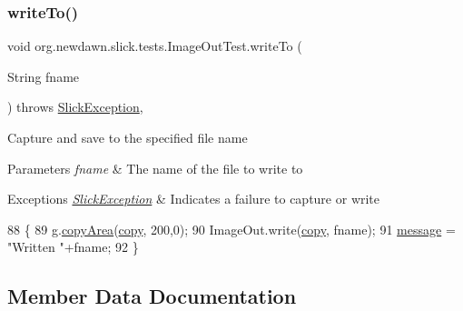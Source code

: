 \subsubsection{\texorpdfstring{write\+To()}{writeTo()}}
{\footnotesize\ttfamily void org.\+newdawn.\+slick.\+tests.\+Image\+Out\+Test.\+write\+To (\begin{DoxyParamCaption}\item[{String}]{fname }\end{DoxyParamCaption}) throws \mbox{\hyperlink{classorg_1_1newdawn_1_1slick_1_1_slick_exception}{Slick\+Exception}}\hspace{0.3cm}{\ttfamily [inline]}, {\ttfamily [private]}}

Capture and save to the specified file name


\begin{DoxyParams}{Parameters}
{\em fname} & The name of the file to write to \\
\hline
\end{DoxyParams}

\begin{DoxyExceptions}{Exceptions}
{\em \mbox{\hyperlink{classorg_1_1newdawn_1_1slick_1_1_slick_exception}{Slick\+Exception}}} & Indicates a failure to capture or write \\
\hline
\end{DoxyExceptions}

\begin{DoxyCode}
88                                                              \{
89         \mbox{\hyperlink{classorg_1_1newdawn_1_1slick_1_1tests_1_1_image_out_test_a0007b2187e2d4d26bdb2d90b39c62479}{g}}.\mbox{\hyperlink{classorg_1_1newdawn_1_1slick_1_1_graphics_adaf19c5b7ba46f3d31243939c8f995a6}{copyArea}}(\mbox{\hyperlink{classorg_1_1newdawn_1_1slick_1_1tests_1_1_image_out_test_ad8082ef3214a67735e03352b0407d0d8}{copy}}, 200,0);
90         ImageOut.write(\mbox{\hyperlink{classorg_1_1newdawn_1_1slick_1_1tests_1_1_image_out_test_ad8082ef3214a67735e03352b0407d0d8}{copy}}, fname);
91         \mbox{\hyperlink{classorg_1_1newdawn_1_1slick_1_1tests_1_1_image_out_test_a96846c61934f6af57af5518de174d7ee}{message}} = \textcolor{stringliteral}{"Written "}+fname;
92     \}
\end{DoxyCode}


\subsection{Member Data Documentation}
\mbox{\label{classorg_1_1newdawn_1_1slick_1_1tests_1_1_image_out_test_a09db11b63df42087043028eceef5d69a}} 
